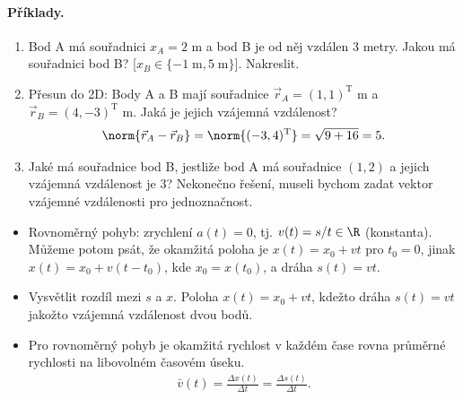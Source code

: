 \documentclass[11pt,a4paper]{article}
\begin{document}
            \paragraph*{Příklady.}
            \begin{enumerate}
                \item Bod A má souřadnici $x_A = 2$ m a bod B je od něj vzdálen 3 metry. Jakou má souřadnici bod B? [$x_B \in \{-1 \;\mathrm m, 5 \;\mathrm m\}$]. Nakreslit.
                \item Přesun do 2D: Body A a B mají souřadnice $\vec r_A = (1,1)^{\mathrm T}$ m a $\vec r_B = (4,-3)^{\mathrm T}$ m. Jaká je jejich vzájemná vzdálenost?
                \begin{align*}
                    \norm{\vec r_A - \vec r_B} = \norm{(-3,4)^{\mathrm T}} = \sqrt{9 + 16} = 5.
                \end{align*}
                
                \item Jaké má souřadnice bod B, jestliže bod A má souřadnice $(1,2)$ a jejich vzájemná vzdálenost je 3? Nekonečno řešení, museli bychom zadat vektor vzájemné vzdálenosti pro jednoznačnost.
            \end{enumerate}

            \begin{itemize}
                \item Rovnoměrný pohyb: zrychlení $a(t) = 0$, tj. $v(t) = s/t \in \R$ (konstanta). Můžeme potom psát, že okamžitá poloha je $x(t) = x_0 + vt$ pro $t_0 = 0$, jinak $x(t) = x_0 + v(t-t_0)$, kde $x_0 = x(t_0)$, a dráha $s(t) = vt$.
                \item Vysvětlit rozdíl mezi $s$ a $x$. Poloha $x(t) = x_0 + vt$, kdežto dráha $s(t) = vt$ jakožto vzájemná vzdálenost dvou bodů.
                \item Pro rovnoměrný pohyb je okamžitá rychlost v každém čase rovna průměrné rychlosti na libovolném časovém úseku.
                \begin{align*}
                    \bar v(t) = \frac{\Delta x(t)}{\Delta t} = \frac{\Delta s(t)}{\Delta t}.
                \end{align*}
            \end{itemize}
\end{document}
